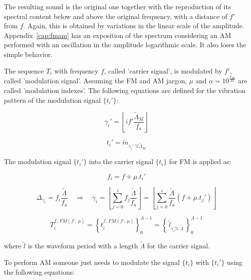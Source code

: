 \documentclass[
 aip,
 jmp,
 amsmath,amssymb,
 reprint,
]{revtex4-1}
\begin{document}
The resulting sound is the original one together with the
reproduction of its spectral content below and above the original frequency,
with a distance of $f'$ from $f$. Again, this is obtained by variations in the
linear scale of the amplitude. Appendix~\ref{cap:fmam} has an exposition of the
spectrum considering an AM performed with an oscillation in the amplitude logarithmic scale. It also loses the simple behavior.

The sequence $T_i$ with frequency $f$, called 'carrier signal', is modulated by
$f'$, called 'modulation signal'. Assuming the FM and AM jargon, $\mu$ and
$\alpha=10^{\frac{V_{dB}}{20}}$ are called 'modulation indexes'. The following
equations are defined for the vibration pattern of the modulation signal
$\{t_i'\}$:

\begin{equation}\label{fmGammaAux}
\gamma_i'=\left \lfloor i f' \frac{\widetilde{\Lambda}_M}{f_a} \right \rfloor
\end{equation}

\begin{equation}\label{fmAux}
t_i'=\widetilde{m}_{\gamma_i' \;\% \widetilde{\Lambda}_M}
\end{equation}

The modulation signal $\{t_i'\}$ into the carrier signal $\{t_i\}$ for FM is applied as:

\begin{equation}\label{fmF}
f_i=f + \mu . t_i'
\end{equation}

\begin{equation}\label{fmGamma}
\Delta_{\gamma_i}=f_i\frac{\widetilde{\Lambda}}{f_a} \quad \Rightarrow \quad \gamma_i = \left \lfloor \sum_{j=0}^{i} f_j \frac{\widetilde{\Lambda}}{f_a} \right \rfloor = \left \lfloor \sum_{j=0}^{i} \frac{\widetilde{\Lambda}}{f_a}(f+\mu . t_j') \right\rfloor
\end{equation}

\begin{equation}\label{fmT}
T_i^{f,\, FM(f',\,\mu)}=\left\{ t_i^{f,\,FM(f',\,\mu)} \right\}_0^{\Lambda-1}=\left\{\,\widetilde{l}_{\gamma_i \%\; \widetilde{\Lambda} } \,\right\}_0^{\Lambda-1}
\end{equation}


\noindent where $\widetilde{l}$ is the waveform period with a length
$\widetilde{\Lambda}$ for the carrier signal.

To perform AM someone just needs to modulate the signal $\{t_i\}$ with $\{t_i'\}$ using
the following equations:
\end{document}
